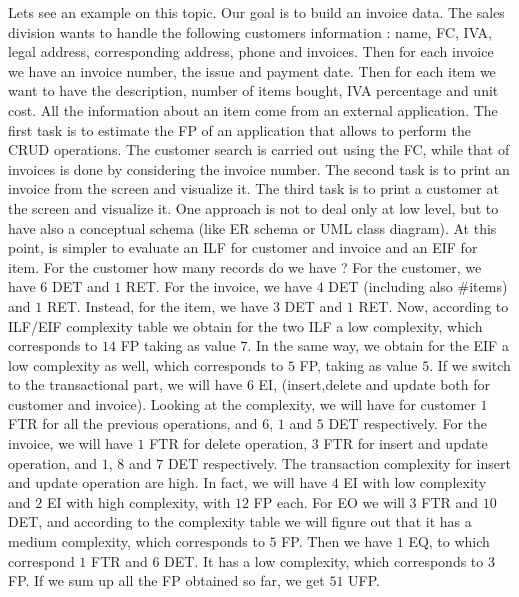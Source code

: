 \documentclass[11pt]{article}
\begin{document}
Lets see an example on this topic. Our goal is to build an invoice data. The sales division wants to handle the following customers information : name, FC, IVA, legal address, corresponding address, phone and invoices. Then for each invoice we have an invoice number, the issue and payment date. Then for each item we want to have the description, number of items bought, IVA percentage and unit cost. All the information about an item come from an external application. The first task is to estimate the FP of an application that allows to perform the CRUD operations. The customer search is carried out using the FC, while that of invoices is done by considering the invoice number. The second task is to print an invoice from the screen and visualize it. The third task is to print a customer at the screen and visualize it. One approach is not to deal only at low level, but to have also a conceptual schema (like ER schema or UML class diagram). At this point, is simpler to evaluate an ILF for customer and invoice and an EIF for item. For the customer how many records do we have ? For the customer, we have $6$ DET and $1$ RET. For the invoice, we have $4$ DET (including also $\#$items) and $1$ RET. Instead, for the item, we have $3$ DET and $1$ RET. Now, according to ILF/EIF complexity table we  obtain for the two ILF a low complexity, which corresponds to $14$ FP taking as value $7$. In the same way, we obtain for the EIF a low complexity as well, which corresponds to $5$ FP, taking as value $5$. If we switch to the transactional part, we will have 6 EI, (insert,delete and update both for customer and invoice). Looking at the complexity, we will have for customer $1$ FTR for all the previous operations, and $6$, $1$ and $5$ DET respectively. For the invoice, we will have $1$ FTR for delete operation, $3$ FTR for insert and update operation, and $1$, $8$ and $7$ DET respectively. The transaction complexity for insert and update operation are high. In fact, we will have $4$ EI with low complexity and $2$ EI with high complexity, with $12$ FP each. For EO we will $3$ FTR and $10$ DET, and according to the complexity table we will figure out that it has a medium complexity, which corresponds to $5$ FP. Then we have $1$ EQ, to which correspond $1$ FTR and $6$ DET. It has a low complexity, which corresponds to $3$ FP. If we sum up all the FP obtained so far, we get $51$ UFP.
\end{document}
